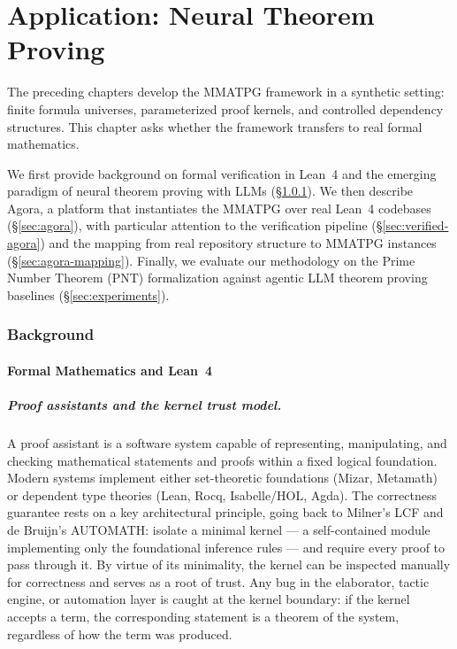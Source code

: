 \chapter{Application: Neural Theorem Proving}\label{chap:application}

The preceding chapters develop the MMATPG framework in a synthetic setting: finite formula universes, parameterized proof kernels, and controlled dependency structures. This chapter asks whether the framework transfers to real formal mathematics.

We first provide background on formal verification in Lean~4 and the emerging paradigm of neural theorem proving with LLMs (\S\ref{sec:lean-background}). We then describe Agora, a platform that instantiates the MMATPG over real Lean~4 codebases (\S\ref{sec:agora}), with particular attention to the verification pipeline (\S\ref{sec:verified-agora}) and the mapping from real repository structure to MMATPG instances (\S\ref{sec:agora-mapping}). Finally, we evaluate our methodology on the Prime Number Theorem (PNT) formalization against agentic LLM theorem proving baselines (\S\ref{sec:experiments}).


\subsection{Background}\label{sec:lean-background}

\subsubsection{Formal Mathematics and Lean~4}

\paragraph{Proof assistants and the kernel trust model.}
A proof assistant is a software system capable of representing, manipulating, and checking mathematical statements and proofs within a fixed logical foundation. Modern systems implement either set-theoretic foundations (Mizar, Metamath) or dependent type theories (Lean, Rocq, Isabelle/HOL, Agda). The correctness guarantee rests on a key architectural principle, going back to Milner's LCF and de Bruijn's AUTOMATH: isolate a minimal kernel --- a self-contained module implementing only the foundational inference rules --- and require every proof to pass through it. By virtue of its minimality, the kernel can be inspected manually for correctness and serves as a root of trust. Any bug in the elaborator, tactic engine, or automation layer is caught at the kernel boundary: if the kernel accepts a term, the corresponding statement is a theorem of the system, regardless of how the term was produced.

